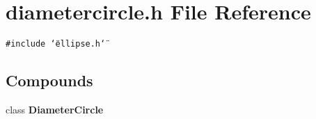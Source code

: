 \section{diametercircle.h File Reference}
\label{diametercircle_8h}
{\tt \#include \char`\"{}ellipse.h\char`\"{}}\par
\subsection*{Compounds}
\begin{CompactItemize}
\item 
class {\bf Diameter\-Circle}
\end{CompactItemize}
